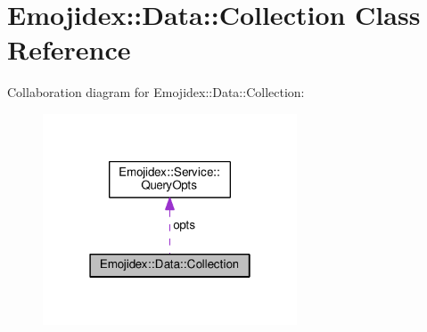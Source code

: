 \hypertarget{classEmojidex_1_1Data_1_1Collection}{}\section{Emojidex\+:\+:Data\+:\+:Collection Class Reference}
\label{classEmojidex_1_1Data_1_1Collection}


Collaboration diagram for Emojidex\+:\+:Data\+:\+:Collection\+:\nopagebreak
\begin{figure}[H]
\begin{center}
\leavevmode
\includegraphics[width=214pt]{classEmojidex_1_1Data_1_1Collection__coll__graph}
\end{center}
\end{figure}
